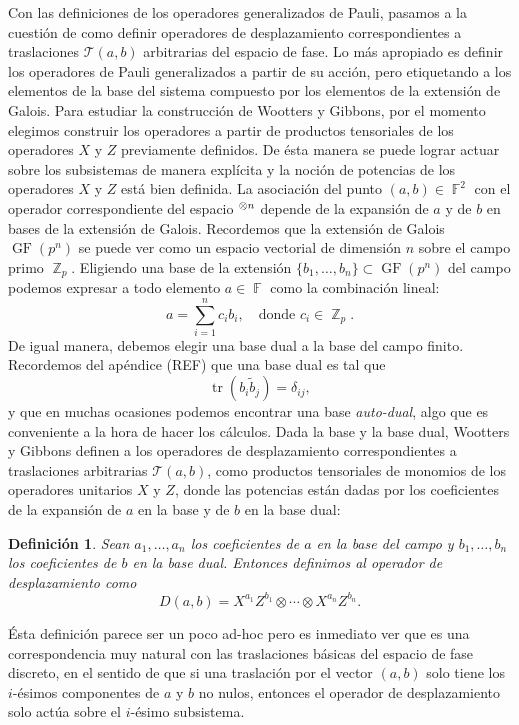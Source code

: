 \documentclass[a4paper]{report}
\DeclareMathOperator{\Z}{\mathbb{Z}}
\DeclareMathOperator{\F}{\mathbb{F}}
\let\H\relax
\DeclareMathOperator{\H}{\mathcal H}
\DeclareMathOperator{\tr}{tr}
\DeclareMathOperator{\GF}{GF}
\newtheorem{definition}{Definición}
\begin{document}
  Con las definiciones de los operadores generalizados de
  Pauli, pasamos a la cuestión de como definir operadores de
  desplazamiento correspondientes a traslaciones $\mathcal
  T(a,b)$ arbitrarias del espacio de fase. Lo más apropiado
  es definir los operadores de Pauli generalizados a partir
  de su acción, pero etiquetando a los elementos de la base
  del sistema compuesto por los elementos de la extensión de
  Galois. Para estudiar la construcción de Wootters y
  Gibbons, por el momento elegimos construir los operadores a
  partir de productos tensoriales de los operadores $X$ y
  $Z$ previamente definidos. De ésta manera se puede lograr
  actuar sobre los subsistemas de manera explícita y la
  noción de potencias de los operadores $X$ y $Z$ está bien
  definida. La asociación del punto $(a,b) \in \F^2$ con el
  operador correspondiente del espacio $\H^{\otimes n}$
  depende de la expansión de $a$ y de $b$ en bases de la
  extensión de Galois.  Recordemos que la extensión de
  Galois $\GF\left(p^{n}\right)$ se puede ver como un
  espacio vectorial de dimensión $n$ sobre el campo primo
  $\Z_p$. Eligiendo una base de la extensión
  $\{b_1,\ldots,b_n\} \subset \GF\left(p^{n}\right)$ del
  campo podemos expresar a todo elemento $a \in \F$ como la
  combinación lineal:
  \[
    a = \sum_{i=1}^{n} c_i b_i,
    \quad
    \text{donde } c_i \in \Z_p.
  \] 
  De igual manera, debemos elegir una base dual a la base
  del campo finito. Recordemos del apéndice (REF) que una
  base dual es tal que
  \[
    \tr(b_i \tilde b_j) = \delta_{ij},
  \] 
  y que en muchas ocasiones podemos encontrar una base
  \textit{auto-dual}, algo que es conveniente a la hora de
  hacer los cálculos. Dada la base y la base dual, Wootters
  y Gibbons definen a los operadores de desplazamiento
  correspondientes a traslaciones arbitrarias $\mathcal
  T(a,b)$, como productos tensoriales de monomios de los
  operadores unitarios $X$ y $Z$, donde las potencias están
  dadas por los coeficientes de la expansión de $a$ en la
  base y de $b$ en la base dual:
  \begin{definition}
    Sean $a_1,\ldots,a_n$ los coeficientes de $a$ en la base
    del campo y $b_1,\ldots,b_n$ los coeficientes de $b$ en
    la base dual. Entonces definimos al operador de
    desplazamiento como
    \begin{equation}
      D(a,b)
      = X^{a_1} Z^{b_1} \otimes \cdots \otimes X^{a_n}
      Z^{b_n}.
    \end{equation}
  \end{definition}
  Ésta definición parece ser un poco ad-hoc pero es
  inmediato ver que es una correspondencia muy natural con
  las traslaciones básicas del espacio de fase discreto,
  en el sentido de que si una traslación por el vector
  $(a,b)$ solo tiene los $i$-ésimos componentes de $a$ y $b$
  no nulos, entonces el operador de desplazamiento solo
  actúa sobre el $i$-ésimo subsistema.
\end{document}
